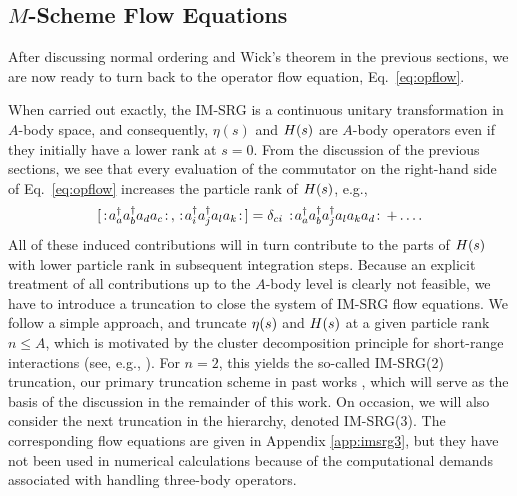 \subsection{\texorpdfstring{$M$}{M}-Scheme Flow Equations}
After discussing normal ordering and Wick's theorem in the previous sections, we are now ready to turn back to the operator flow equation, Eq.~\eqref{eq:opflow}. 

When carried out exactly, the IM-SRG is a continuous unitary transformation in $A$-body space, and consequently, $\eta(s)$ and $H(s)$ are $A$-body operators even if they initially have a lower rank at $s=0$. From the discussion of the previous sections, we see that every evaluation of the commutator on the right-hand side of Eq.~\eqref{eq:opflow} increases the particle rank of $H(s)$, e.g.,
\begin{equation}\label{eq:induced}
  \comm{\nord{\aaO_{a}\aaO_{b}\aO_{d}\aO_{c}}}{\nord{\aaO_{i}\aaO_{j}\aO_{l}\aO_{k}}}= \delta_{ci}\nord{\aaO_{a}\aaO_{b}\aaO_{j}\aO_{l}\aO_{k}\aO_{d}}+\ldots.
\end{equation}
All of these induced contributions will in turn contribute to the parts of $H(s)$ with lower particle rank in subsequent integration steps. Because an explicit treatment of all contributions up to the $A$-body level is clearly not feasible, we have to introduce a truncation to close the system of IM-SRG flow equations. We follow a simple approach, and truncate $\eta(s)$ and $H(s)$ at a given particle rank $n\leq A$, which is motivated by the cluster decomposition principle for short-range interactions (see, e.g., \cite{Weinberg:1996uf}). For $n=2$, this yields the so-called IM-SRG(2) truncation, our primary truncation scheme in past works \cite{Tsukiyama:2011uq,Tsukiyama:2012fk,Hergert:2013mi}, which will serve as the basis of the discussion in the remainder of this work. On occasion, we will also consider the next truncation in the hierarchy, denoted IM-SRG(3). The corresponding flow equations are given in Appendix \ref{app:imsrg3}, but they have not been used in numerical calculations because of the computational demands associated with handling three-body operators.

